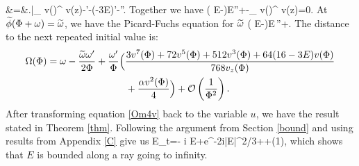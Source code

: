 \documentclass[a4paper,reqno]{amsart}
\theoremstyle{definition}
\theoremstyle{remark}
\theoremstyle{theorem}
\numberwithin{equation}{section}
\begin{document}
&=&\left.\right|_{ v(\Phi)}^{ v(z)}-\phit'-\left(-3E\right)\Psi'-\phit''.
\eeqn
Together we have
\ben
\left( E-\right)E\phit''+\phit-_{ v(\Phi)}^{ v(z)}=0.
\een
At $\widetilde{\phi}(\Phi+\omega)=\widetilde{\omega}$, we have the Picard-Fuchs equation for $\widetilde{\omega}$
\ben
\left( E-\right)E\,\omt''+.
\een	
The distance to the next repeated initial value is:
\begin{align}
\Om(\Phi)&=\om-\frac{\omt\om'}{2\Phi}+\frac{\om'}{\Phi}\Bigl(\frac{3 v^7(\Phi) + 72 v^5(\Phi) + 512 v^3(\Phi) + 64(16-3E) v(\Phi)}{768 v_z(\Phi)}\label{Om4v}\\
&\phantom{=\om-\frac{\omt\om'}{2\Phi}+\frac{\om'}{\Phi}\Bigl(} 
\ +\frac{\al v^2(\Phi)}{4} \Bigr)+\ord\left(\frac{1}{\Phi^2}\right).\nn
\end{align}
After transforming equation \eqref{Om4v} back to the variable $u$, we have the result stated in Theorem \ref{thm}. Following the argument from Section \ref{bound} and using results from Appendix \ref{C} give us
\be
E_t=- i E+e^{-2i\tht}|E|^{2/3}++\ord(1),
\ee
which shows that $E$ is bounded along a ray going to infinity.
\end{document}
